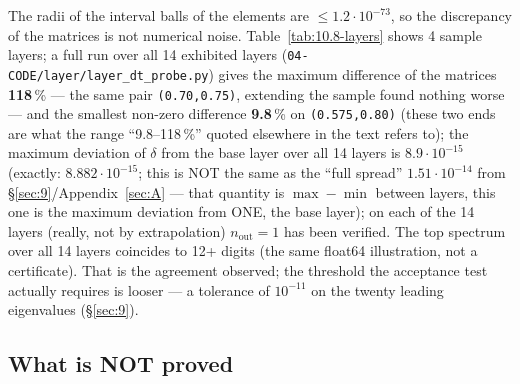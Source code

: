 The radii of the interval balls of the elements are $\leq 1.2\cdot 10^{-73}$, so the discrepancy of the
matrices is not numerical noise. Table~\ref{tab:10.8-layers} shows 4 sample layers; a full run over all 14
exhibited layers (\texttt{04-\allowbreak CODE/\allowbreak layer/\allowbreak layer\_\allowbreak dt\_\allowbreak probe.py}) gives the maximum difference of the matrices
\textbf{118}\,\% --- the same pair \texttt{(0.70,0.75)}, extending the sample found nothing worse --- and the
smallest non-zero difference \textbf{9.8}\,\% on \texttt{(0.575,0.80)} (these two ends are what the range
``9.8--118\,\%'' quoted elsewhere in the text refers to); the maximum
deviation of $\delta$ from the base layer over all 14 layers is $8.9\cdot 10^{-15}$ (exactly: $8.882\cdot 10^{-15}$;
this is NOT the same as the ``full spread'' $1.51\cdot 10^{-14}$ from \S\ref{sec:9}/Appendix~\ref{sec:A} --- that quantity is
$\max-\min$ between layers, this one is the maximum deviation from ONE, the base layer); on each of the
14 layers (really, not by extrapolation) $n_{\mathrm{out}} = 1$ has been verified. The top spectrum over
all 14 layers coincides to 12+ digits (the same float64 illustration, not a
certificate). That is the agreement observed; the threshold the acceptance test
actually requires is looser --- a tolerance of $10^{-11}$ on the twenty leading
eigenvalues (\S\ref{sec:9}).


\subsection{What is NOT proved}
\label{sec:10.9}

